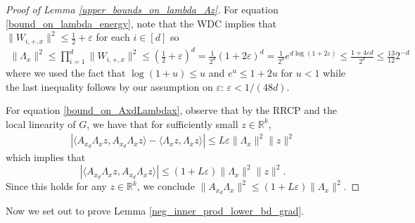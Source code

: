 \documentclass[11pt]{article}
\renewcommand{\epsilon}{\varepsilon}
\newcommand{\R}{\mathbb{R}}
\newcommand{\G}{G}
\theoremstyle{remark}
\begin{document}
\begin{proof}[Proof of Lemma \ref{upper_bounds_on_lambda_Az}]

For equation \eqref{bound_on_lambda_energy}, note that the WDC implies that $\|W_{i,+,x}\|^2 \leqslant \frac{1}{2}+\epsilon$ for each $i \in [d]$ so \begin{align*}
    \|\Lambda_x\|^2 \leqslant \prod_{i=1}^d \|W_{i,+,x}\|^2 \leqslant \left(\frac{1}{2} + \epsilon\right)^d = \frac{1}{2^d}(1 + 2\epsilon)^d = \frac{1}{2^d}e^{d\log(1+2\epsilon)}\leqslant \frac{1 + 4\epsilon d}{2^d} \leqslant \frac{13}{12}2^{-d}
\end{align*} where we used the fact that $\log(1 + u) \leqslant u$ and $e^{u} \leqslant 1 + 2u$ for $u < 1$ while the last inequality follows by our assumption on $\epsilon$: $\epsilon < 1/(48d)$.

For equation \eqref{bound_on_AxdLambdax}, observe that by the RRCP and the local linearity of $\G$, we have that for sufficiently small $z \in \R^k$, \begin{align*}
    \left|\langle A_{x_d}\Lambda_x z, A_{x_d} \Lambda_x z\rangle - \langle \Lambda_x z, \Lambda_x z \rangle\right| \leqslant L\epsilon \|\Lambda_x \|^2\|z\|^2
\end{align*} which implies that $$\left|\langle A_{x_d}\Lambda_x z, A_{x_d} \Lambda_x z\rangle\right| \leqslant (1 + L\epsilon) \|\Lambda_x \|^2\|z\|^2.$$ Since this holds for any $z \in \R^k$, we conclude $\|A_{x_d}\Lambda_x\|^2 \leqslant (1+L\epsilon)\|\Lambda_x\|^2$.
\end{proof}

Now we set out to prove Lemma \ref{neg_inner_prod_lower_bd_grad}.
\end{document}
